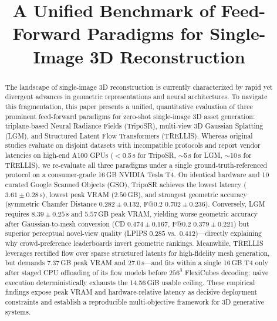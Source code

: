 \documentclass[10pt, conference]{IEEEtran}
\begin{document}
\title{A Unified Benchmark of Feed-Forward Paradigms for Single-Image 3D Reconstruction}

\author{
}

\maketitle

\begin{abstract}
The landscape of single-image 3D reconstruction is currently characterized by rapid yet divergent advances in geometric representations and neural architectures. To navigate this fragmentation, this paper presents a unified, quantitative evaluation of three prominent feed-forward paradigms for zero-shot single-image 3D asset generation: triplane-based Neural Radiance Fields (TripoSR), multi-view 3D Gaussian Splatting (LGM), and Structured Latent Flow Transformers (TRELLIS). Whereas original studies evaluate on disjoint datasets with incompatible protocols and report vendor latencies on high-end A100 GPUs ($<$0.5\,s for TripoSR, $\sim$5\,s for LGM, $\sim$10\,s for TRELLIS), we re-evaluate all three paradigms under a single ground-truth-referenced protocol on a consumer-grade 16\,GB NVIDIA Tesla T4. On identical hardware and 10 curated Google Scanned Objects (GSO), TripoSR achieves the lowest latency ($3.61 \pm 0.28$\,s), lowest peak VRAM ($2.50$\,GB), and strongest geometric accuracy (symmetric Chamfer Distance $0.282 \pm 0.132$, F@0.2 $0.702 \pm 0.236$). Conversely, LGM requires $8.39 \pm 0.25$\,s and $5.57$\,GB peak VRAM, yielding worse geometric accuracy after Gaussian-to-mesh conversion (CD $0.474 \pm 0.167$, F@0.2 $0.379 \pm 0.221$) but superior perceptual novel-view quality (LPIPS $0.285$ vs.\ $0.412$)---directly explaining why crowd-preference leaderboards invert geometric rankings. Meanwhile, TRELLIS leverages rectified flow over sparse structured latents for high-fidelity mesh generation, but demands $7.37$\,GB peak VRAM and $27.0$\,s---and fits within a single 16\,GB T4 only after staged CPU offloading of its flow models before $256^3$ FlexiCubes decoding; na\"{\i}ve execution deterministically exhausts the 14.56\,GiB usable ceiling. These empirical findings expose peak VRAM and hardware-relative latency as decisive deployment constraints and establish a reproducible multi-objective framework for 3D generative systems.
\end{abstract}
\end{document}

